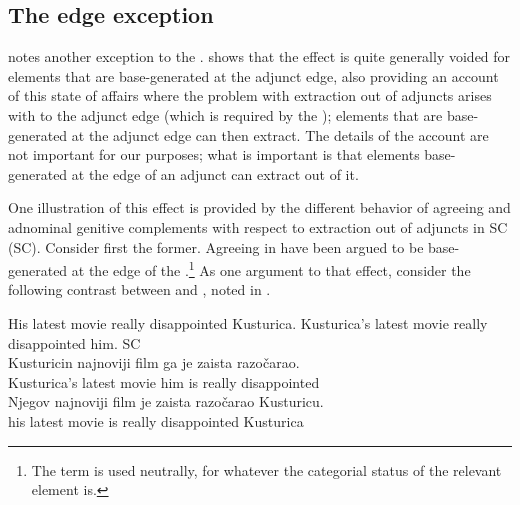 \documentclass[output=paper]{langsci/langscibook}
\begin{document}
\subsection{The edge exception}

\textcite{Boskovic2018} notes another exception to the
.  \textcite{Boskovic2018} shows that
the  effect is quite generally voided
for elements that are base-generated at the adjunct edge, also providing an
account of this state of affairs where the problem with extraction out of
adjuncts arises with  to the adjunct edge (which is required by
the ); elements that are base-generated at the adjunct edge
can then extract.  The details of the account are not important for our
purposes; what is important is that elements base-generated at the edge of an
adjunct can extract out of it.

One illustration of this effect is provided by the different behavior of
agreeing  and adnominal genitive complements
with respect to extraction out of adjuncts in \glsdesc{SC}
(\gls{SC}).  Consider first the former.  Agreeing  in
 have been argued to be base-generated at the edge of the
.\footnote{The term  is used neutrally, for
whatever the categorial status of the relevant element is.} As one argument to
that effect, consider the following  contrast between
 and , noted in \textcite{Despic2011,Despic2013}.

\ea\label{ex:35.17}
	\ea His latest movie really disappointed Kusturica.
	\ex Kusturica’s latest movie really disappointed him.
    \ex\label{ex-26:17c} \glsdesc{SC} \parencites[31]{Despic2011}[245]{Despic2013}\\
        \gll    \llap{*}Kusturicin najnoviji  film ga je zaista razočarao.\\
                Kusturica’s  latest  movie  him  is  really  disappointed\\
	\ex
        \gll    \llap{*}Njegov najnoviji film je zaista razočarao Kusturicu.\\
                his latest movie is really disappointed Kusturica\\
	\z
\z
\end{document}
